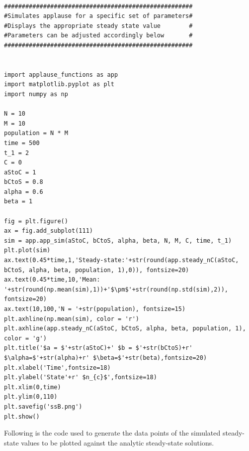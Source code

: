 \begin{lstlisting}

#####################################################
#Simulates applause for a specific set of parameters#
#Displays the appropriate steady state value        #
#Parameters can be adjusted accordingly below       #
#####################################################


import applause_functions as app
import matplotlib.pyplot as plt
import numpy as np

N = 10
M = 10
population = N * M
time = 500
t_1 = 2
C = 0
aStoC = 1
bCtoS = 0.8
alpha = 0.6
beta = 1

fig = plt.figure()
ax = fig.add_subplot(111)
sim = app.app_sim(aStoC, bCtoS, alpha, beta, N, M, C, time, t_1)
plt.plot(sim)
ax.text(0.45*time,1,'Steady-state:'+str(round(app.steady_nC(aStoC, bCtoS, alpha, beta, population, 1),0)), fontsize=20)
ax.text(0.45*time,10,'Mean: '+str(round(np.mean(sim),1))+'$\pm$'+str(round(np.std(sim),2)), fontsize=20)
ax.text(10,100,'N = '+str(population), fontsize=15)
plt.axhline(np.mean(sim), color = 'r')
plt.axhline(app.steady_nC(aStoC, bCtoS, alpha, beta, population, 1), color = 'g')
plt.title('$a = $'+str(aStoC)+' $b = $'+str(bCtoS)+r' $\alpha=$'+str(alpha)+r' $\beta=$'+str(beta),fontsize=20)
plt.xlabel('Time',fontsize=18)
plt.ylabel('State'+r' $n_{c}$',fontsize=18)
plt.xlim(0,time)
plt.ylim(0,110)
plt.savefig('ssB.png')
plt.show()

\end{lstlisting}

Following is the code used to generate the data points of the simulated steady-state values to be plotted against the analytic steady-state solutions.

